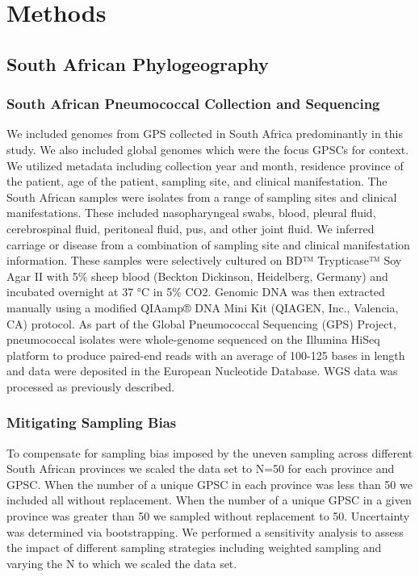 \documentclass{article}
\begin{document}
\section{Methods}
\subsection{South African Phylogeography}
\subsubsection{South African Pneumococcal Collection and Sequencing}
We included genomes from GPS  collected in South Africa predominantly in this study. We also included global genomes which were the focus GPSCs for context. We utilized metadata including collection year and month, residence province of the patient, age of the patient, sampling site, and clinical manifestation. The South African samples were isolates from a range of sampling sites and clinical manifestations. These included nasopharyngeal swabs, blood, pleural fluid, cerebrospinal fluid, peritoneal fluid, pus, and other joint fluid. We inferred carriage or disease from a combination of sampling site and clinical manifestation information.
These samples were selectively cultured on BD™ Trypticase™ Soy Agar II with 5\% sheep blood (Beckton Dickinson, Heidelberg, Germany) and incubated overnight at 37 °C in 5\% CO2. Genomic DNA was then extracted manually using a modified QIAamp® DNA Mini Kit (QIAGEN, Inc., Valencia, CA) protocol. As part of the Global Pneumococcal Sequencing (GPS) Project, pneumococcal isolates were whole-genome sequenced on the Illumina HiSeq platform to produce paired-end reads with an average of 100-125 bases in length and data were deposited in the European Nucleotide Database. WGS data was processed as previously described\cite{gladstoneInternationalGenomicDefinition2019b}.
\subsubsection{Mitigating Sampling Bias}
To compensate for sampling bias imposed by the uneven sampling across different South African provinces we scaled the data set to N=50 for each province and GPSC. When the number of a unique GPSC in each province was less than 50 we included all without replacement. When the number of a unique GPSC in a given province was greater than 50 we sampled without replacement to 50. Uncertainty was determined via bootstrapping. We performed a sensitivity analysis to assess the impact of different sampling strategies including weighted sampling and varying the N to which we scaled the data set.  
\end{document}
